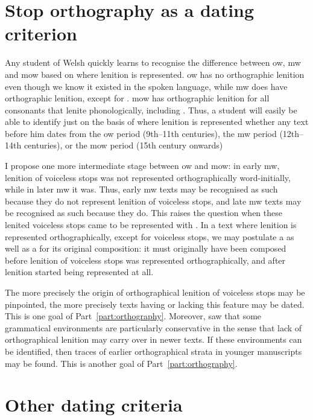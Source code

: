 \section{Stop orthography as a dating criterion}
\label{sec:lenit-voic-stops-1}
Any student of Welsh quickly learns to recognise the difference between \gls{ow}, \gls{mw} and \gls{mow} based on where lenition is represented. \Gls{ow} has no orthographic lenition even though we know it existed in the spoken language, while \gls{mw} does have orthographic lenition, except for . \Gls{mow} has orthographic lenition for all consonants that lenite phonologically, including . Thus, a student will easily be able to identify just on the basis of where lenition is represented whether any text before him dates from the \gls{ow} period (9th--11th centuries), the \gls{mw} period (12th--14th centuries), or the \gls{mow} period (15th century onwards)

I propose one more intermediate stage between \gls{ow} and \gls{mow}: in early \gls{mw}, lenition of voiceless stops was not represented orthographically word-initially, while in later \gls{mw} it was. Thus, early \gls{mw} texts may be recognised as such because they do not represent lenition of voiceless stops, and late \gls{mw} texts may be recognised as such because they do. This raises the question when these lenited voiceless stops came to be represented with . In a text where  lenition is represented orthographically, except for voiceless stops, we may postulate a  as well as a  for its original composition: it must originally have been composed before lenition of voiceless stops was represented orthographically, and after lenition started being represented at all.

The more precisely the origin of orthographical lenition of voiceless stops may be pinpointed, the more precisely texts having or lacking this feature may be dated. This is one goal of Part~\ref{part:orthography}. Moreover, \textcite{van_development14} saw that some grammatical environments are particularly conservative in the sense that lack of orthographical lenition may carry over in newer texts. If these environments can be identified, then traces of  earlier orthographical strata in younger manuscripts may be found. This is another goal of Part~\ref{part:orthography}.

\section{Other dating criteria}
\label{sec:other-dating-crit}

